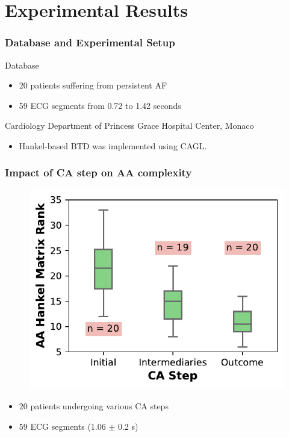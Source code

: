 \documentclass{beamer}
\begin{document}
\section{Experimental Results}

	\begin{frame}
		\frametitle{Database and Experimental Setup} 
			
		\begin{block}{Database}
			\begin{itemize}
				\item 20 patients suffering from persistent AF
				\item 59 ECG segments from 0.72 to 1.42 seconds
			\end{itemize}
			
			\begin{center}
				Cardiology Department of Princess Grace Hospital Center, Monaco
			\end{center}					
		\end{block}	
		
		\begin{itemize}
			\item Hankel-based BTD was implemented using CAGL.
		\end{itemize}
	\end{frame}

	\begin{frame}
		\frametitle{Impact of CA step on AA complexity}
		
		\vspace{-0.5cm}
		\begin{figure}[h]
			\centering
			\includegraphics[scale=0.9]{boxplot_complexity.pdf}
		\end{figure}
		\vspace{-0.5cm}
		\begin{itemize}
			\item 20 patients undergoing various CA steps
			\item 59 ECG segments (1.06 $\pm$ 0.2 s)
		\end{itemize}
	\end{frame}
\end{document}
